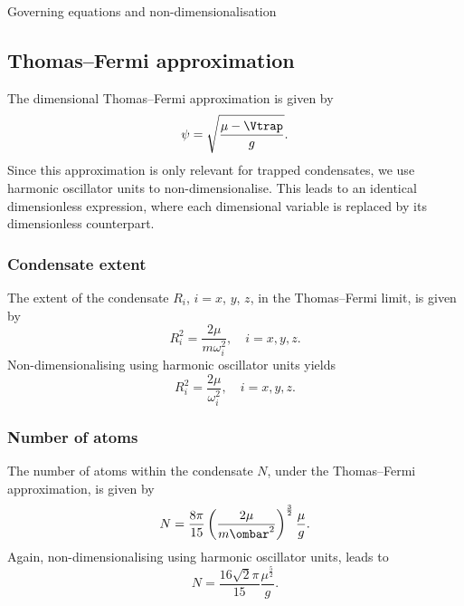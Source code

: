 \begin{chapter}{\label{cha:equations}Governing equations and
  non-dimensionalisation}
  \subsection{Thomas--Fermi approximation}
  The dimensional Thomas--Fermi approximation is given by
  \begin{equation*}
    \psi = \sqrt{\frac{\mu-\Vtrap}{g}}.
  \end{equation*}
  Since this approximation is only relevant for trapped condensates, we use
  harmonic oscillator units to non-dimensionalise.  This leads to an identical
  dimensionless expression, where each dimensional variable is replaced by its
  dimensionless counterpart.

  \subsubsection{Condensate extent}
  The extent of the condensate $R_{i}$, $i = x$, $y$, $z$, in the Thomas--Fermi
  limit, is given by
  \begin{equation*}
    R_{i}^{2} = \frac{2\mu}{m\omega_{i}^{2}}, \quad i = x, y, z.
  \end{equation*}
  Non-dimensionalising using harmonic oscillator units yields
  \begin{equation*}
    R_{i}^{2} = \frac{2\mu}{\omega_{i}^{2}}, \quad i = x, y, z.
  \end{equation*}

  \subsubsection{Number of atoms}
  The number of atoms within the condensate $N$, under the Thomas--Fermi
  approximation, is given by
  \begin{equation*}
    N = \frac{8\pi}{15} \left( \frac{2\mu}{m\ombar^2} \right)^{\frac{3}{2}}
    \frac{\mu}{g}.
  \end{equation*}
  Again, non-dimensionalising using harmonic oscillator units, leads to
  \begin{equation*}
    N = \frac{16\sqrt{2}\pi}{15} \frac{\mu^{\frac{5}{2}}}{g}.
  \end{equation*}


\end{chapter}
